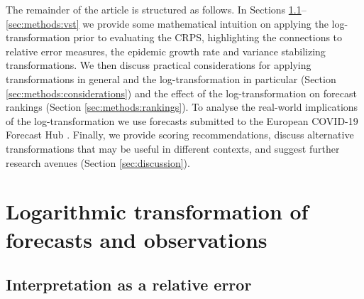 \documentclass{article}
\begin{document}
The remainder of the article is structured as follows. In Sections \ref{sec:methods:relative}--\ref{sec:methods:vst} we provide some mathematical intuition on applying the log-transformation prior to evaluating the CRPS, highlighting the connections to relative error measures, the epidemic growth rate and variance stabilizing transformations.
We then discuss practical considerations for applying transformations in general and the log-transformation in particular (Section \ref{sec:methods:considerations}) and the effect of the log-transformation on forecast rankings (Section \ref{sec:methods:rankings}). To analyse the real-world implications of the log-transformation we use forecasts submitted to the European COVID-19 Forecast Hub  \citep[ Section \ref{sec:HUB}]{europeancovid-19forecasthubEuropeanCovid19Forecast2021, sherrattPredictivePerformanceMultimodel2022}. Finally, we provide scoring recommendations, discuss alternative transformations that may be useful in different contexts, and suggest further research avenues (Section \ref{sec:discussion}). 


\section{Logarithmic transformation of forecasts and observations}
\label{sec:methods}

\subsection{Interpretation as a relative error}
\label{sec:methods:relative}
\end{document}
